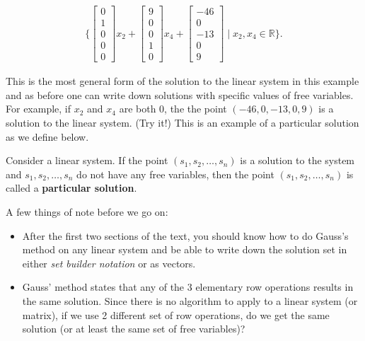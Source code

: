 \begin{example}
\begin{align*}
\{ \begin{bmatrix}
0 \\ 1 \\ 0 \\ 0 \\0
\end{bmatrix} x_2 + 
\begin{bmatrix}
9 \\ 0 \\ 0 \\ 1 \\ 0
\end{bmatrix} x_4 + 
\begin{bmatrix}
-46 \\ 0  \\ -13 \\ 0 \\ 9 
\end{bmatrix} \;  | \; x_2, x_4 \in \mathbb{R} \}.
\end{align*}

This is the most general form of the solution to the linear system in this example and as before one can write down solutions with specific values of free variables.  For example, if $x_2$ and $x_4$ are both 0, the the point $(-46,0,-13,0,9)$ is a solution to the linear system.  (Try it!)  This is an example of a particular solution as we define below.


 \end{example}

\begin{definition}
Consider a linear system.  If the point $(s_1,s_2,\ldots,s_n)$ is a solution to the system and $s_1, s_2, \ldots, s_n$ do not have any free variables, then the point $(s_1,s_2,\ldots,s_n)$ is called a \textbf{particular solution}.  
\end{definition}



A few things of note before we go on: 

\begin{itemize}
\item After the first two sections of the text, you should know how to do Gauss's method on any linear system and be able to write down the solution set in either \emph{set builder notation} or as vectors.  

\item Gauss' method states that any of the 3 elementary row operations results in the same solution.  Since there is no algorithm to apply to a linear system (or matrix), if we use 2 different set of row operations, do we get the same solution (or at least the same set of free variables)?  
\end{itemize}

